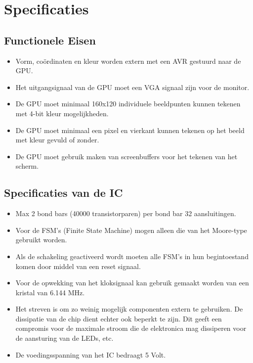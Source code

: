 \documentclass{scrreprt} %
\date{22 november 2013}
\begin{document}
\chapter{Specificaties}
\section {Functionele Eisen}
\begin {itemize}
\item Vorm, coördinaten en kleur worden extern met een AVR gestuurd naar de GPU.
\item Het uitgangsignaal van de GPU moet een VGA signaal zijn voor de monitor. 
\item De GPU moet minimaal 160x120 individuele beeldpunten kunnen tekenen met 4-bit kleur mogelijkheden.
\item De GPU moet minimaal een pixel en vierkant kunnen tekenen op het beeld met kleur gevuld of zonder.
\item De GPU moet gebruik maken van screenbuffers voor het tekenen van het scherm.
\end{itemize}


\section {Specificaties van de IC}
\begin {itemize}
\item Max 2 bond bars (40000 transistorparen) per bond bar 32 aansluitingen.
\item Voor de FSM’s (Finite State Machine) mogen alleen die van het Moore-type gebruikt worden.
\item Als de schakeling geactiveerd wordt moeten alle FSM’s in hun begintoestand komen door middel van een reset signaal.
\item Voor de opwekking van het kloksignaal kan gebruik gemaakt worden van een kristal van 6.144 MHz.
\item Het streven is om zo weinig mogelijk componenten extern te gebruiken. De dissipatie van de
chip dient echter ook beperkt te zijn. Dit geeft een compromis voor de maximale stroom die de elektronica mag dissiperen voor de aansturing van de LEDs, etc.
\item De voedingsspanning van het IC bedraagt 5 Volt.
\end{itemize}
\end{document}
